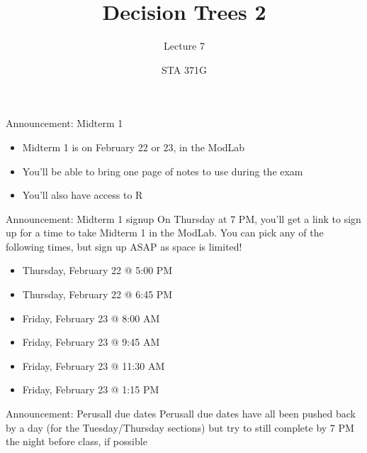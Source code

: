 \documentclass{beamer}\usepackage[]{graphicx}\usepackage[]{color}
\title{Decision Trees 2}
\subtitle{Lecture 7}
\author{STA 371G}
\begin{document}
  
  

  \frame{\maketitle}



  \begin{darkframes}
    

    \begin{frame}{Announcement: Midterm 1}
      \begin{itemize}
        \item Midterm 1 is on February 22 or 23, in the ModLab
        \item You'll be able to bring one page of notes to use during the exam
        \item You'll also have access to R
      \end{itemize}
    \end{frame}

    \begin{frame}{Announcement: Midterm 1 signup}
      On Thursday at 7 PM, you'll get a link to sign up for a time to take Midterm 1 in the ModLab. You can pick any of the following times, but sign up ASAP as space is limited!
      \begin{itemize}
        \item Thursday, February 22 @ 5:00 PM
        \item Thursday, February 22 @ 6:45 PM
        \item Friday, February 23 @ 8:00 AM
        \item Friday, February 23 @ 9:45 AM
        \item Friday, February 23 @ 11:30 AM
        \item Friday, February 23 @ 1:15 PM
      \end{itemize}
    \end{frame}

    \begin{frame}{Announcement: Perusall due dates}
      Perusall due dates have all been pushed back by a day (for the Tuesday/Thursday sections) but try to still complete by 7 PM the night before class, if possible
    \end{frame}


\end{darkframes}
\end{document}

